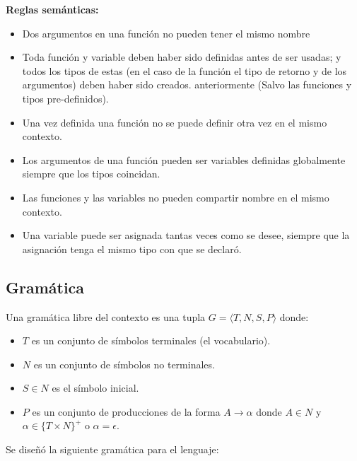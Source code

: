 \textbf{Reglas sem\'anticas:}
\begin{itemize}
	\item Dos argumentos en una funci\'on no pueden tener el mismo nombre
	\item Toda funci\'on y variable deben haber sido definidas antes de ser usadas; y todos los tipos de estas (en el caso de la funci\'on el tipo de retorno y de los argumentos) deben haber sido creados. anteriormente (Salvo las funciones y tipos pre-definidos).
	\item Una vez definida una funci\'on no se puede definir otra vez en el mismo contexto.
	\item Los argumentos de una funci\'on pueden ser variables definidas globalmente siempre que los tipos coincidan.
	\item Las funciones y las variables no pueden compartir nombre en el mismo contexto.
	\item Una variable puede ser asignada tantas veces como se desee, siempre que la asignaci\'on tenga el mismo tipo con que se declar\'o.
\end{itemize}

\subsection{Gramática}

Una gramática libre del contexto es una tupla $G = \langle T, N, S, P \rangle$ donde:

\begin{itemize}
        \item $T$ es un conjunto de símbolos terminales (el vocabulario).
        \item $N$ es un conjunto de símbolos no terminales.
        \item $S \in N$ es el símbolo inicial.
        \item $P$ es un conjunto de producciones de la forma $A \rightarrow \alpha$  donde $A \in N$ y $\alpha \in \{T \times N\}^+$ o $\alpha = \epsilon$.
\end{itemize}

Se diseñó la siguiente gramática para el lenguaje:

